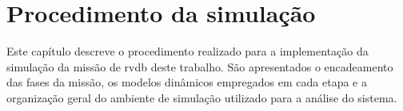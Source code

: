 \chapter{Procedimento da simulação}
\label{sec_Procedimento_simulacao}

Este capítulo descreve o procedimento realizado para a implementação da simulação da missão de \gls{rvdb} deste trabalho. 
São apresentados o encadeamento das fases da missão, os modelos dinâmicos empregados em cada etapa e a organização geral do ambiente de simulação utilizado para a análise do sistema.











